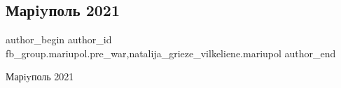  
 
 
 
 

\subsection{Марiyполь 2021}
\label{sec:14_02_2023.fb.fb_group.mariupol.pre_war.4.mariypol_2021}
 
\ifcmt
 author_begin
   author_id fb_group.mariupol.pre_war,natalija_grieze_vilkeliene.mariupol
 author_end
\fi

Марiyполь 2021
